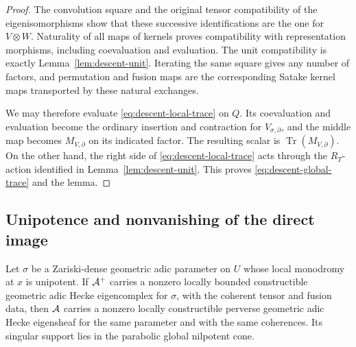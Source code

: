 \begin{proof}
The convolution square and the original tensor compatibility of
the eigenisomorphisms show that these successive identifications
are the one for $V\otimes W$.  Naturality of all maps of kernels
proves compatibility with representation morphisms, including
coevaluation and evaluation.  The unit compatibility is exactly
Lemma~\ref{lem:descent-unit}.  Iterating the same square gives any
number of factors, and permutation and fusion maps are the
corresponding Satake kernel maps transported by these natural
exchanges.

We may therefore evaluate \eqref{eq:descent-local-trace} on $Q$.
Its coevaluation and evaluation become the ordinary insertion and
contraction for $V_{\sigma,\partial}$, and the middle map becomes
$M_{V,\partial}$ on its indicated factor.  The resulting scalar is
$\operatorname{Tr}(M_{V,\partial})$.  On the other hand, the right
side of \eqref{eq:descent-local-trace} acts through the $R_T$-action
identified in Lemma~\ref{lem:descent-unit}.  This proves
\eqref{eq:descent-global-trace} and the lemma.
\end{proof}

\subsection{Unipotence and nonvanishing of the direct image}

\begin{proposition}\label{prop:torus-descent}
Let $\sigma$ be a Zariski-dense geometric adic parameter on $U$
whose local monodromy at $x$ is unipotent.  If $\mathcal A^+$ carries a
nonzero locally bounded constructible geometric adic Hecke
eigencomplex for $\sigma$, with the coherent tensor and fusion data,
then $\mathcal A$ carries a nonzero locally constructible perverse geometric
adic Hecke eigensheaf for the same parameter and with the same
coherences.  Its singular support lies in the parabolic global
nilpotent cone.
\end{proposition}

